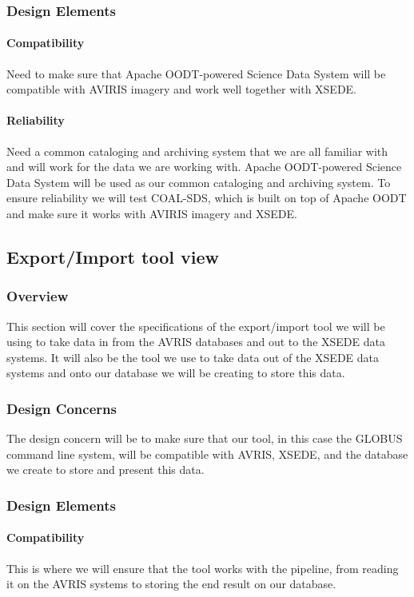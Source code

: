 \documentclass[10pt,draftclsnofoot,onecolumn,journal,compsoc]{IEEEtran}
\begin{document}
\subsubsection{Design Elements}
\paragraph{Compatibility}
\noindent Need to make sure that Apache OODT-powered Science Data System will be compatible with AVIRIS imagery and work well together with XSEDE.
\paragraph{Reliability}
\noindent Need a common cataloging and archiving system that we are all familiar with and will work for the data we are working with. Apache OODT-powered Science Data System will be used as our common cataloging and archiving system. To ensure reliability we will test COAL-SDS, which is built on top of Apache OODT and make sure it works with AVIRIS imagery and XSEDE.

\subsection{Export/Import tool view}
\subsubsection{Overview}
This section will cover the specifications of the export/import tool we will be using to take data in from the AVRIS databases and out to the XSEDE data systems. It will also be the tool we use to take data out of the XSEDE data systems and onto our database we will be creating to store this data.
\subsubsection{Design Concerns}
The design concern will be to make sure that our tool, in this case the GLOBUS command line system, will be compatible with AVRIS, XSEDE, and the database we create to store and present this data.
\subsubsection{Design Elements}
\paragraph{Compatibility}
This is where we will ensure that the tool works with the pipeline, from reading it on the AVRIS systems to storing the end result on our database.
\end{document}
